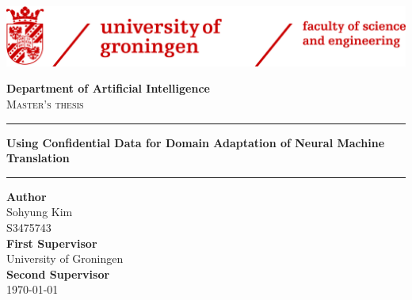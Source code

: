 \begin{titlepage}
    \begin{center}
        \vspace{0.5cm}
        
        \includegraphics[width=\textwidth]{images/banner.png}
        
        \vspace{1cm}
        
        \textbf{Department of Artificial Intelligence}\\
        \textsc{Master's thesis}
        
        \vspace{0.5cm}
        
        \LARGE
        \noindent\rule{13cm}{0.8pt}
        \textbf{Using Confidential Data for Domain Adaptation of Neural Machine Translation}
        \noindent\rule{13cm}{0.8pt}
        
        \vspace{2cm}
        
        \normalsize
        \textbf{Author}\\
        Sohyung Kim\\
        S3475743\\
        \vspace{0.5cm}
        \textbf{First Supervisor}\\
        University of Groningen\\
        \vspace{0.5cm}
        \textbf{Second Supervisor}\\
        
        
        \vfill
        \today
    \end{center}
\end{titlepage}